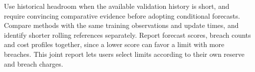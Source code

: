 Use historical headroom when the available validation history is short, and require convincing comparative evidence before adopting conditional forecasts. Compare methods with the same training observations and update times, and identify shorter rolling references separately. Report forecast scores, breach counts and cost profiles together, since a lower score can favor a limit with more breaches. This joint report lets users select limits according to their own reserve and breach charges.

\FloatBarrier

